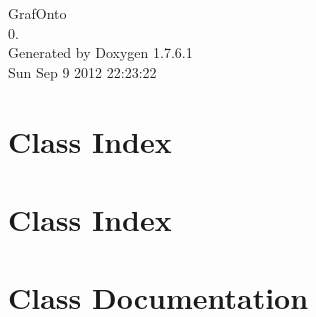 \documentclass[a4paper]{book}
\begin{document}
\hypersetup{pageanchor=false,citecolor=blue}
\begin{titlepage}
\vspace*{7cm}
\begin{center}
{\Large \-Graf\-Onto \\[1ex]\large 0. }\\
\vspace*{1cm}
{\large \-Generated by Doxygen 1.7.6.1}\\
\vspace*{0.5cm}
{\small Sun Sep 9 2012 22:23:22}\\
\end{center}
\end{titlepage}
\clearemptydoublepage
{}
\tableofcontents
\clearemptydoublepage
{}
\hypersetup{pageanchor=true,citecolor=blue}
\chapter{\-Class \-Index}

\chapter{\-Class \-Index}

\chapter{\-Class \-Documentation}



















\printindex
\end{document}
